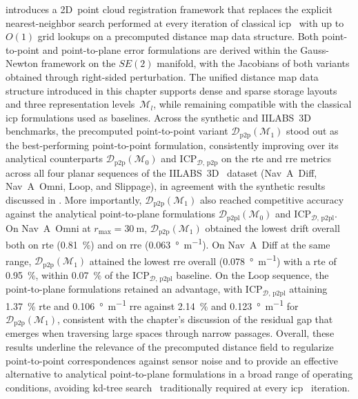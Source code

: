  introduces a 2D~point cloud registration
framework that replaces the explicit nearest-neighbor search performed
at every iteration of classical
\gls{icp}~\cite{besl-mckay:tpami:1992,chen-medioni:icra:1991} with up
to $O(1)$ grid lookups on a precomputed distance map data structure.
Both point-to-point and point-to-plane error formulations are derived
within the Gauss-Newton framework on the $SE(2)$ manifold, with the
Jacobians of both variants obtained through right-sided perturbation.
The unified distance map data structure introduced in this chapter
supports dense and sparse storage layouts and three representation
levels~$\mathcal{M}_l$, while remaining compatible with the classical
\gls{icp} formulations used as baselines. Across the synthetic and
IILABS~3D~\cite{ribeiro:access:2025} benchmarks, the precomputed
point-to-point variant $\mathcal{D}_\mathrm{p2p}(\mathcal{M}_1)$ stood
out as the best-performing point-to-point formulation, consistently
improving over its analytical counterparts
$\mathcal{D}_\mathrm{p2p}(\mathcal{M}_0)$ and
$\mathrm{ICP}_{\mathcal{D},\,\mathrm{p2p}}$ on the \gls{rte} and
\gls{rre} metrics across all four planar sequences of the
IILABS~3D~\cite{ribeiro:access:2025} dataset (Nav~A~Diff, Nav~A~Omni,
Loop, and Slippage), in agreement with the synthetic results
discussed in . More importantly,
$\mathcal{D}_\mathrm{p2p}(\mathcal{M}_1)$ also reached competitive
accuracy against the analytical point-to-plane formulations
$\mathcal{D}_\mathrm{p2pl}(\mathcal{M}_0)$ and
$\mathrm{ICP}_{\mathcal{D},\,\mathrm{p2pl}}$. On Nav~A~Omni
at $r_\mathrm{max} = \SI{30}{\metre}$, $\mathcal{D}_\mathrm{p2p}(\mathcal{M}_1)$
obtained the lowest drift overall both on \gls{rte}
(\SI{0.81}{\percent}) and on \gls{rre} (\SI{0.063}{\degree\per\metre}).
On Nav~A~Diff at the same range, $\mathcal{D}_\mathrm{p2p}(\mathcal{M}_1)$
attained the lowest \gls{rre} overall (\SI{0.078}{\degree\per\metre}) with
a \gls{rte} of \SI{0.95}{\percent}, within \SI{0.07}{\percent} of the
$\mathrm{ICP}_{\mathcal{D},\,\mathrm{p2pl}}$ baseline. On the Loop sequence,
the point-to-plane formulations retained an advantage, with
$\mathrm{ICP}_{\mathcal{D},\,\mathrm{p2pl}}$ attaining
\SI{1.37}{\percent} \gls{rte} and \SI{0.106}{\degree\per\metre}
\gls{rre} against \SI{2.14}{\percent} and \SI{0.123}{\degree\per\metre}
for $\mathcal{D}_\mathrm{p2p}(\mathcal{M}_1)$, consistent with the
chapter's discussion of the residual gap that emerges when traversing
large spaces through narrow passages. Overall, these results
underline the relevance of the precomputed distance field to
regularize point-to-point correspondences against sensor noise and to
provide an effective alternative to analytical point-to-plane
formulations in a broad range of operating conditions,
avoiding kd-tree search~\cite{bentley:cacm:1975} traditionally required at every
\gls{icp}~\cite{besl-mckay:tpami:1992,chen-medioni:icra:1991} iteration.


